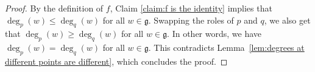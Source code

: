\documentclass[10pt,a4paper]{amsart}
\def\g{\mathfrak{g}}
\begin{document}
\begin{proof}
    By the definition of $f$, Claim \ref{claim:f is the identity} implies that $\deg_p(w) \leq \deg_q(w)$ for all $w \in \g$. Swapping the roles of $p$ and $q$, we also get that $\deg_p(w) \geq \deg_q(w)$ for all $w \in \g$. In other words, we have $\deg_p(w) = \deg_q(w)$ for all $w \in \g$. This contradicts Lemma~\ref{lem:degrees at different points are different}, which concludes the proof.
\end{proof}
\end{document}
